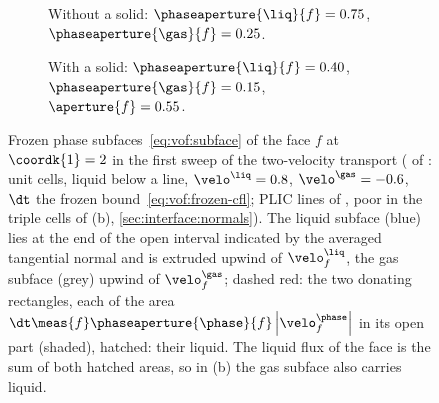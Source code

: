 \begin{figure}
\begin{subfigure}[b]{0.45\textwidth}
\begin{tikzpicture}[x=2.1cm,y=2.1cm]
    \end{tikzpicture}
    \caption{Without a solid: $\phaseaperture{\liq}{f}=\chkVofFrozenLiquidA$,
      $\phaseaperture{\gas}{f}=\chkVofFrozenGasA$.}
    \label{fig:vof:frozen:plain}
  \end{subfigure}%
  \hfill
  \begin{subfigure}[b]{0.45\textwidth}
    \centering
    \caption{With a solid: $\phaseaperture{\liq}{f}=\chkVofFrozenLiquidB$,
      $\phaseaperture{\gas}{f}=\chkVofFrozenGasB$,
      $\aperture{f}=\chkVofFrozenOpenB$.}
    \label{fig:vof:frozen:cut}
  \end{subfigure}
  \caption{Frozen phase subfaces~\cref{eq:vof:subface} of the face
    $f$ at $\coordk{1}=2$ in the first sweep of the two-velocity transport
    ( of : unit cells, liquid
    below a line, $\velo^{\liq}=0.8$, $\velo^{\gas}=-0.6$, $\dt$ the frozen
    bound~\cref{eq:vof:frozen-cfl}; PLIC lines of , poor in the
    triple cells of (b), \cref{sec:interface:normals}). The liquid subface
    (blue) lies at the end of the open interval indicated by the averaged
    tangential normal and is extruded upwind of $\velo^{\liq}_f$, the gas
    subface (grey) upwind of $\velo^{\gas}_f$; dashed red: the two donating
    rectangles, each of the area $\dt\meas{f}\phaseaperture{\phase}{f}\abs{\velo^{\phase}_f}$ in
    its open part (shaded), hatched: their liquid. The liquid flux of the face
    is the sum of both hatched areas, so in (b) the gas subface also carries
    liquid.}
  \label{fig:vof:frozen}
\end{figure}
